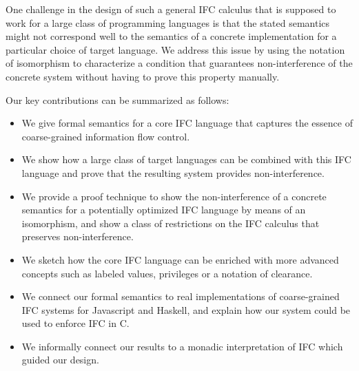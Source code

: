 One challenge in the design of such a general IFC calculus that
is supposed to work for a large class of programming languages is
that the stated semantics might not correspond well to the
semantics of a concrete implementation for a particular choice
of target language.  We address this issue by using the notation
of isomorphism to characterize a condition that guarantees
non-interference of the concrete system without having to prove
this property manually.

Our key contributions can be summarized as follows:
\begin{itemize}
  \item We give formal semantics for a core IFC language that
  captures the essence of coarse-grained information flow control.
  \item We show how a large class of target languages can be combined
  with this IFC language and prove that the resulting system provides
  non-interference.
  \item We provide a proof technique to show the non-interference
  of a concrete semantics for a potentially optimized IFC language
  by means of an isomorphism, and show a class of restrictions on
  the IFC calculus that preserves non-interference.
  \item We sketch how the core IFC language can be enriched with
  more advanced concepts such as labeled values, privileges or a
  notation of clearance.
  \item We connect our formal semantics to real implementations of
  coarse-grained IFC systems for Javascript and Haskell, and explain
  how our system could be used to enforce IFC in C.
  \item We informally connect our results to a monadic interpretation
  of IFC which guided our design.
\end{itemize}



